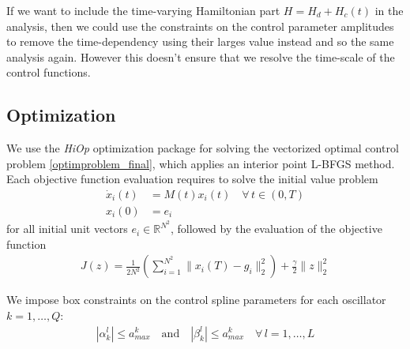 \documentclass[letterpaper]{article}
\newcommand{\R}{\mathds{R}}
\begin{document}
       If we want to include the time-varying Hamiltonian part $H = H_d + H_c(t)$ in the analysis, then we could use the constraints on the control parameter amplitudes to remove the time-dependency using their larges value instead and so the same analysis again. However this doesn't ensure that we resolve the time-scale of the control functions. 

  \subsection{Optimization}
    We use the \textit{HiOp} optimization package for solving the vectorized optimal control problem \eqref{optimproblem_final}, which applies an interior point L-BFGS method. Each objective function evaluation requires to solve the initial value problem  
        \begin{align*}
          \dot x_i(t) &= M(t) x_i(t) \quad \forall \, t\in (0,T) \\
          x_i(0) &= e_i
        \end{align*}
        for all initial unit vectors $e_i \in \R^{N^2}$, followed by the evaluation of the objective function 
        \begin{align}
          J(z) = \frac{1}{2N^2} \left(\sum_{i=1}^{N^2} \|x_i(T) - g_i\|^2_2  \right) + \frac{\gamma}{2} \| z\|^2_2
        \end{align}

    We impose box constraints on the control spline parameters for each oscillator $k=1,\dots, Q$:
        \begin{align}
          | \alpha^l_k| \leq a_{max}^k \quad \text{and} \quad | \beta^l_k|  \leq a_{max}^k \quad \forall \, l=1,\dots, L 
        \end{align}
\end{document}
